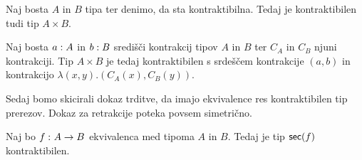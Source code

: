 \begin{trditev}
  Naj bosta \(A\) in \(B\) tipa ter denimo, da sta kontraktibilna. Tedaj je kontraktibilen tudi tip \(A \times B\).
\end{trditev}

\begin{dokaz}
  Naj bosta \(a : A\) in \(b : B\) središči kontrakcij tipov \(A\) in \(B\) ter \(C_{A}\) in \(C_{B}\) njuni kontrakciji. Tip \(A \times B\) je tedaj kontraktibilen s srdeščem kontrakcije \((a, b)\) in kontrakcijo \(\lambda(x, y).(C_{A}(x), C_{B}(y))\).
\end{dokaz}

Sedaj bomo skicirali dokaz trditve, da imajo ekvivalence res kontraktibilen tip prerezov. Dokaz za retrakcije poteka povsem simetrično.

\begin{trditev}
  Naj bo \(f \,\colon A \to B\) ekvivalenca med tipoma \(A\) in \(B\). Tedaj je tip \(\textnormal{\textsf{sec}}(f)\) kontraktibilen.
\end{trditev}

